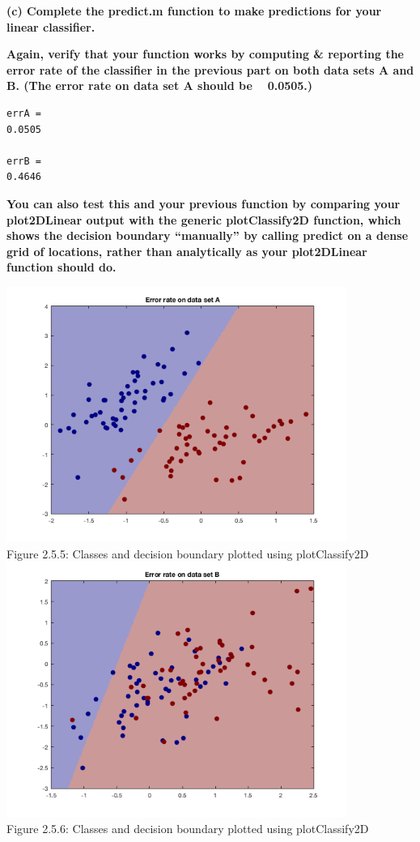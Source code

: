 \documentclass[]{scrreprt}   %
\begin{document}
\textbf{(c) Complete the predict.m function to make predictions for your linear classifier.}



\bigbreak

\textbf{Again, verify that your function works by computing \& reporting the error rate of the classifier in the previous part on both data sets A and B. (The error rate on data set A should be ~ 0.0505.)}

\begin{verbatim}
errA =
0.0505

errB =
0.4646
\end{verbatim}

\textbf{You can also test this and your previous function by comparing your plot2DLinear output with the generic plotClassify2D function, which shows the decision boundary “manually” by calling predict on a dense grid of locations, rather than analytically as your plot2DLinear function should do.}

\begin{center}
	\includegraphics[width=30em,keepaspectratio]{p5figure5.png}\\
	{Figure 2.5.5: Classes and decision boundary plotted using plotClassify2D}
	\includegraphics[width=30em,keepaspectratio]{p5figure6.png}\\
	{Figure 2.5.6: Classes and decision boundary plotted using plotClassify2D}
\end{center} 
\end{document}
